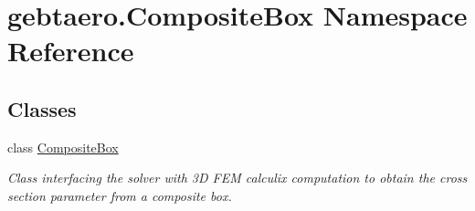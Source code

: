 \hypertarget{namespacegebtaero_1_1_composite_box}{}\section{gebtaero.\+Composite\+Box Namespace Reference}
\label{namespacegebtaero_1_1_composite_box}
\subsection*{Classes}
\begin{DoxyCompactItemize}
\item 
class \hyperlink{classgebtaero_1_1_composite_box_1_1_composite_box}{Composite\+Box}
\begin{DoxyCompactList}\small\item\em Class interfacing the solver with 3D F\+EM calculix computation to obtain the cross section parameter from a composite box. \end{DoxyCompactList}\end{DoxyCompactItemize}
